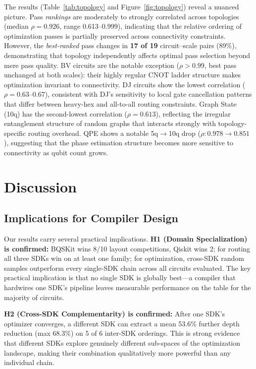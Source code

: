 \documentclass[conference]{IEEEtran}
\begin{document}
The results (Table~\ref{tab:topology} and Figure~\ref{fig:topology}) reveal a nuanced picture.
Pass \emph{rankings} are moderately to strongly correlated across topologies (median $\rho = 0.926$, range 0.613--0.999), indicating that the relative ordering of optimization passes is partially preserved across connectivity constraints.
However, the \emph{best-ranked} pass changes in \textbf{17 of 19} circuit--scale pairs (89\%), demonstrating that topology independently affects optimal pass selection beyond mere pass quality.
BV circuits are the notable exception ($\rho > 0.99$, best pass unchanged at both scales): their highly regular CNOT ladder structure makes optimization invariant to connectivity.
DJ circuits show the lowest correlation ($\rho = 0.63$--$0.67$), consistent with DJ's sensitivity to local gate cancellation patterns that differ between heavy-hex and all-to-all routing constraints.
Graph State (10q) has the second-lowest correlation ($\rho = 0.613$), reflecting the irregular entanglement structure of random graphs that interacts strongly with topology-specific routing overhead.
QPE shows a notable 5q$\to$10q drop ($\rho: 0.978 \to 0.851$), suggesting that the phase estimation structure becomes more sensitive to connectivity as qubit count grows.


\section{Discussion}
\label{sec:discussion}

\subsection{Implications for Compiler Design}

Our results carry several practical implications.
\textbf{H1 (Domain Specialization) is confirmed:}
BQSKit wins 8/10 layout competitions, Qiskit wins 2; for routing all three SDKs win on at least one family; for optimization, cross-SDK random samples outperform every single-SDK chain across all circuits evaluated.
The key practical implication is that no single SDK is globally best---a compiler that hardwires one SDK's pipeline leaves measurable performance on the table for the majority of circuits.

\textbf{H2 (Cross-SDK Complementarity) is confirmed:}
After one SDK's optimizer converges, a different SDK can extract a mean 53.6\% further depth reduction (max 68.3\%) on 5 of 6 inter-SDK orderings.
This is strong evidence that different SDKs explore genuinely different sub-spaces of the optimization landscape, making their combination qualitatively more powerful than any individual chain.
\end{document}
